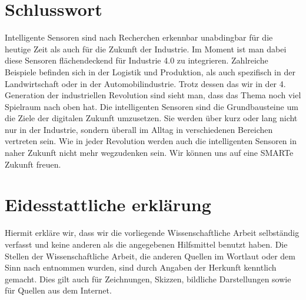 \documentclass[a4paper,12pt]{scrartcl}
\begin{document}
\cite[Seite 3 ff.]{Elhoseny.2019}  
\newpage

\section{Schlusswort}
Intelligente Sensoren sind nach Recherchen erkennbar unabdingbar für die heutige Zeit als auch für die Zukunft der Industrie. Im Moment ist man dabei diese Sensoren flächendeckend für Industrie 4.0 zu integrieren. Zahlreiche Beispiele befinden sich in der Logistik und Produktion, als auch spezifisch in der Landwirtschaft oder in der Automobilindustrie. Trotz dessen das wir in der 4. Generation der industriellen Revolution sind sieht man, dass das Thema noch viel Spielraum nach oben hat. Die intelligenten Sensoren sind die Grundbausteine um die Ziele der digitalen Zukunft umzusetzen. Sie werden über kurz oder lang nicht nur in der Industrie, sondern überall im Alltag in verschiedenen Bereichen vertreten sein. Wie in jeder Revolution werden auch die intelligenten Sensoren in naher Zukunft nicht mehr wegzudenken sein. Wir können uns auf eine SMARTe Zukunft freuen.

\newpage



\newpage
\section{Eidesstattliche erklärung}
Hiermit erkläre wir, dass wir die vorliegende Wissenschaftliche Arbeit selbständig verfasst und keine anderen als die angegebenen Hilfsmittel benutzt haben.
Die Stellen der Wissenschaftliche Arbeit, die anderen Quellen im Wortlaut oder dem Sinn nach entnommen wurden, sind durch Angaben der Herkunft kenntlich gemacht. Dies gilt auch für Zeichnungen, Skizzen, bildliche Darstellungen sowie für Quellen aus dem Internet.
\clearpage
\listoffigures
\newpage


\end{document}
